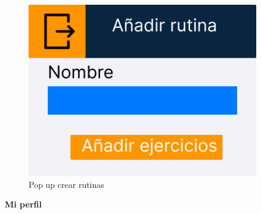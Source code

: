 \begin{figure}[H]
\begin{minipage}{0.45\textwidth}
      \label{fig:Ejercicios rutina descargada}
   \end{minipage}%
   \hspace{0.5cm}
   \begin{minipage}{0.45\textwidth}
      \centering
      \includegraphics[width=0.9\textwidth]{fotos/Frame 65.png}
      \caption{Pop up crear rutinas}
      \label{fig:Pop up crear rutinas}
   \end{minipage}
\end{figure}

\newpage

\textbf{Mi perfil}

